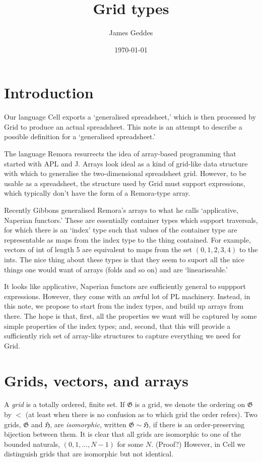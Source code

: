\documentclass[11pt]{article}
\author{James Geddes}
\date{\today}
\title{Grid types}
\newcommand{\gr}[1]{\mathfrak{#1}}
\newcommand{\GG}{\gr{G}}
\begin{document}
\maketitle

\section{Introduction}

Our language Cell exports a `generalised spreadsheet,' which is then processed
by Grid to produce an actual spreadsheet. This note is an attempt to describe a
possible definition for a `generalised spreadsheet.'

The language Remora
\cite{slepak:array:2014,remora:intro:2019,slepak:semantics:2019} resurrects the
idea of array-based programming that started with APL and J. Arrays look ideal
as a kind of grid-like data structure with which to generalise the
two-dimensional spreadsheet grid. However, to be usable as a spreadsheet, the
structure used by Grid must support expressions, which typically don't have the
form of a Remora-type array.

Recently Gibbons \cite{gibbons:aplicative:2017} generalised Remora's arrays to
what he calls `applicative, Naperian functors.' These are essentially container
types which support traversals, for which there is an `index' type such that
values of the container type are representable as maps from the index type to
the thing contained. For example, vectors of int of length 5 are equivalent to
maps from the set \((0, 1, 2, 3, 4)\) to the ints. The nice thing about these
types is that they seem to suport all the nice things one would want of arrays
(folds and so on) and are `lineariseable.'

It looks like applicative, Naperian functors are sufficiently general to
suppport expressions. However, they come with an awful lot of PL
machinery. Instead, in this note, we propose to start from the index types, and
build up arrays from there. The hope is that, first, all the properties we want
will be captured by some simple properties of the index types; and, second, that
this will provide a sufficiently rich set of array-like structures to capture
everything we need for Grid.


\section{Grids, vectors, and arrays}

A \emph{grid} is a totally ordered, finite set. If \(\GG\) is a grid, we denote
the ordering on \(\GG\) by \(<\) (at least when there is no confusion as to
which grid the order refers). Two grids, \(\gr{G}\) and \(\gr{H}\), are
\emph{isomorphic}, written \(\gr{G}\sim \gr{H}\), if there is an order-preserving
bijection between them. It is clear that all grids are isomorphic to one of the
bounded naturals, \((0, 1, \dotsc, N-1)\) for some \(N\). (Proof?) However, in
Cell we distinguish grids that are isomorphic but not identical.
\end{document}
